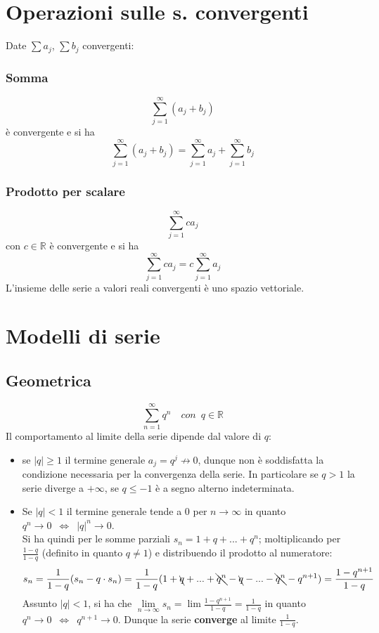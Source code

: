 \documentclass[10pt, oneside]{book}
\theoremstyle{plain}
\begin{document}
\section{Operazioni sulle s. convergenti}
Date $\sum a_j$, $\sum b_j$ convergenti:
\subsubsection*{Somma}
\[\sum \limits_{j = 1}^{\infty} (a_j + b_j)\]
è convergente e si ha 
\[\sum \limits_{j = 1}^{\infty} (a_j + b_j) = \sum \limits_{j = 1}^{\infty} a_j + \sum \limits_{j = 1}^{\infty} b_j\]
\subsubsection{Prodotto per scalare}
\[\sum \limits_{j = 1}^{\infty} c a_j\]
con $c \in \mathbb{R}$ è convergente e si ha
\[\sum \limits_{j = 1}^{\infty} c a_j = c \sum \limits_{j = 1}^{\infty} a_j\]
L'insieme delle serie a valori reali convergenti è uno spazio vettoriale.

\section{Modelli di serie}

\subsection{Geometrica}
\[\sum \limits_{n=1}^{\infty} q^n \quad con \enspace q \in \mathbb{R}\]
Il comportamento al limite della serie dipende dal valore di $q$:
\begin{itemize}[label=$\ast$]
    \item se $|q| \geq 1$ il termine generale $a_j = q^j \nrightarrow 0$, dunque non è soddisfatta la condizione necessaria per la convergenza della serie.
    In particolare se $q > 1$ la serie diverge a $+ \infty$, se $q \leq -1$ è a segno alterno indeterminata.
    \item Se $|q| < 1$ il termine generale tende a 0 per $n \rightarrow \infty$ in quanto $q^n \rightarrow 0 \enspace \Leftrightarrow \enspace |q|^n \rightarrow 0$.
    \\Si ha quindi per le somme parziali $s_n = 1 + q + ... + q^n$; moltiplicando per $\displaystyle \frac{1 - q}{1 - q}$ (definito in quanto $q \neq 1$) e distribuendo il prodotto al numeratore:
    \[s_n = \frac{1}{1 -q} (s_n - q \cdot s_n) = \frac{1}{1 -q} (1 + \bcancel{q} + ... + \bcancel{q^n} - \bcancel{q} - ... - \bcancel{q^{n}} - q^{n+1}) = \frac{1 - q^{n+1}}{1 - q}\]
    Assunto $|q| < 1$, si ha che $\lim \limits_{n \rightarrow \infty} s_n = \lim \frac{1 - q^{n+1}}{1 - q} = \frac{1}{1 - q}$ in quanto $q^n \rightarrow 0 \enspace \Leftrightarrow \enspace q^{n+1} \rightarrow 0$. Dunque la serie \textbf{converge} al limite $\displaystyle \frac{1}{1-q}$.
\end{itemize}
\end{document}
